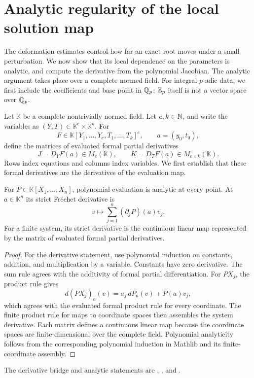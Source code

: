 \section{Analytic regularity of the local solution map}
\label{sec:regularity}
The deformation estimates control how far an exact root moves under a small
perturbation. We now show that its local dependence on the parameters is
analytic, and compute the derivative from the polynomial Jacobian. The
analytic argument takes place over a complete normed field. For integral
$p$-adic data, we first include the coefficients and base point in $\mathbb Q_p$;
$\mathbb Z_p$ itself is not a vector space over $\mathbb Q_p$.

Let $\mathbb K$ be a complete nontrivially normed field. Let $e,k\in\mathbb N$, and
write the variables as $(Y,T)\in\mathbb K^e\times\mathbb K^k$. For
\[
 F\in\mathbb K[Y_1,\ldots,Y_e,T_1,\ldots,T_k]^e,
 \qquad a=(y_0,t_0),
\]
define the matrices of evaluated formal partial derivatives
\begin{equation}
 J=D_YF(a)\in M_e(\mathbb K),\qquad
 K=D_TF(a)\in M_{e\times k}(\mathbb K).
 \label{eq:regularity-blocks}
\end{equation}
Rows index equations and columns index variables. We first establish that
these formal derivatives are the derivatives of the evaluation map.

\begin{lemma}
\label{lem:actual-polynomial-derivative}
For $P\in\mathbb K[X_1,\ldots,X_n]$, polynomial evaluation is analytic at
every point. At $a\in\mathbb K^n$ its strict Fr\'echet derivative is
\[
 v\longmapsto\sum_{j=1}^n (\partial_jP)(a)v_j.
\]
For a finite system, its strict derivative is the continuous linear map
represented by the matrix of evaluated formal partial derivatives.
\end{lemma}
\begin{proof}
For the derivative statement, use polynomial induction on constants,
addition, and multiplication by a variable. Constants have zero derivative.
The sum rule agrees with the additivity of formal partial differentiation.
For $PX_j$, the product rule gives
\[
 d(PX_j)_a(v)=a_j\,dP_a(v)+P(a)v_j,
\]
which agrees with the evaluated formal product rule for every coordinate.
The finite product rule for maps to coordinate spaces then assembles the
system derivative. Each matrix defines a continuous linear map because the
coordinate spaces are finite-dimensional over the complete field.
Polynomial analyticity follows from the corresponding polynomial induction
in Mathlib and its finite-coordinate assembly.
\end{proof}
The derivative bridge and analytic statements are
,
, and
.

